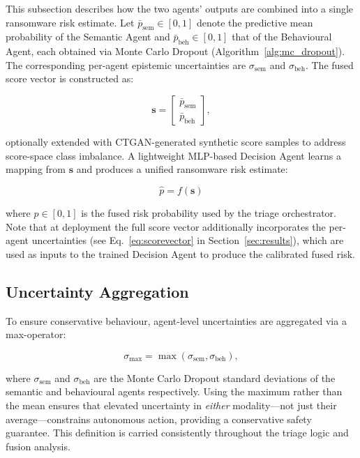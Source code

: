 \documentclass[3p]{elsarticle}
\begin{document}
This subsection describes how the two agents' outputs are combined into a single ransomware risk estimate.
Let $\bar{p}_{\text{sem}} \in [0,1]$ denote the predictive mean probability of the Semantic Agent
and $\bar{p}_{\text{beh}} \in [0,1]$ that of the Behavioural Agent, each obtained via Monte Carlo
Dropout (Algorithm~\ref{alg:mc_dropout}).
The corresponding per-agent epistemic uncertainties are $\sigma_{\text{sem}}$ and $\sigma_{\text{beh}}$.
The fused score vector is constructed as:

\begin{equation}
\mathbf{s} =
\begin{bmatrix}
\bar{p}_{\text{sem}} \\
\bar{p}_{\text{beh}}
\end{bmatrix},
\label{eq:scorevec_basic}
\end{equation}

optionally extended with CTGAN-generated synthetic score samples to address score-space class imbalance.
A lightweight MLP-based Decision Agent learns a mapping from $\mathbf{s}$ and produces a unified
ransomware risk estimate:

\begin{equation}
\hat{p} = f(\mathbf{s})
\label{eq:scorepool}
\end{equation}

where $\hat{p} \in [0,1]$ is the fused risk probability used by the triage orchestrator.
Note that at deployment the full score vector additionally incorporates the per-agent uncertainties
(see Eq.~\ref{eq:scorevector} in Section~\ref{sec:results}), which are used as inputs to the
trained Decision Agent to produce the calibrated fused risk.

\subsection{Uncertainty Aggregation}

To ensure conservative behaviour, agent-level uncertainties are aggregated via a max-operator:

\begin{equation}
\sigma_{\max} = \max(\sigma_{\text{sem}}, \sigma_{\text{beh}}),
\label{eq:sigmamax}
\end{equation}

where $\sigma_{\text{sem}}$ and $\sigma_{\text{beh}}$ are the Monte Carlo Dropout standard
deviations of the semantic and behavioural agents respectively. Using the maximum rather than
the mean ensures that elevated uncertainty in \emph{either} modality---not just their
average---constrains autonomous action, providing a conservative safety guarantee.
This definition is carried consistently throughout the triage logic and fusion analysis.
\end{document}
